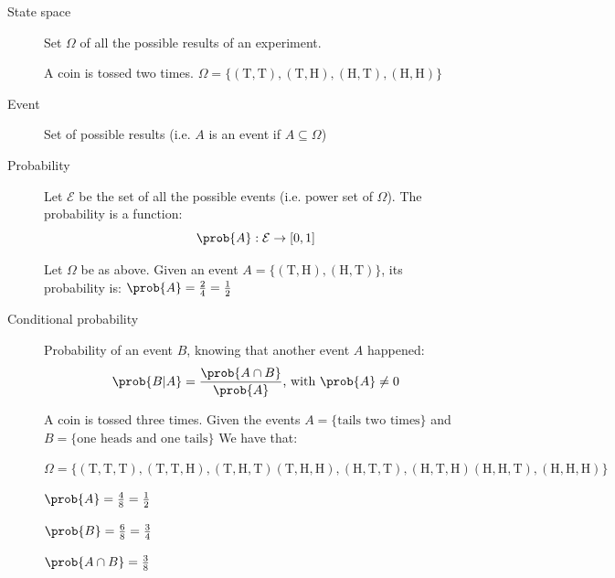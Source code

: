 \begin{description}
    \item[State space] 
        Set $\Omega$ of all the possible results of an experiment.
        \begin{example}
            A coin is tossed two times. 
            $\Omega = \{ (\text{T}, \text{T}), (\text{T}, \text{H}), (\text{H}, \text{T}), (\text{H}, \text{H}) \}$
        \end{example}

    \item[Event] 
        Set of possible results (i.e. $A$ is an event if $A \subseteq \Omega$)

    \item[Probability] 
        Let $\mathcal{E}$ be the set of all the possible events (i.e. power set of $\Omega$).
        The probability is a function:
        \[ \prob{A}: \mathcal{E} \rightarrow [0, 1] \]
        \begin{example}
            Let $\Omega$ be as above.
            Given an event $A = \{ (\text{T}, \text{H}), (\text{H}, \text{T}) \}$, 
            its probability is: $\prob{A} = \frac{2}{4} = \frac{1}{2}$
        \end{example}

    \item[Conditional probability] 
        Probability of an event $B$, knowing that another event $A$ happened:
        \[ \prob{B \vert A} = \frac{\prob{A \cap B}}{\prob{A}} \text{, with } \prob{A} \neq 0 \]

        \begin{example}
            A coin is tossed three times. 
            Given the events $A = \{ \text{tails two times} \}$ and $B = \{ \text{one heads and one tails} \}$
            We have that:

            \begin{minipage}{\linewidth}
                \centering
                \small
                $\Omega = \{ 
                    (\text{T}, \text{T}, \text{T}), (\text{T}, \text{T}, \text{H}), (\text{T}, \text{H}, \text{T})
                    (\text{T}, \text{H}, \text{H}), (\text{H}, \text{T}, \text{T}), (\text{H}, \text{T}, \text{H})
                    (\text{H}, \text{H}, \text{T}), (\text{H}, \text{H}, \text{H})
                \}$
            \end{minipage}

            \begin{minipage}{.325\linewidth}
                \centering
                $\prob{A} = \frac{4}{8} = \frac{1}{2}$
            \end{minipage}
            \begin{minipage}{.325\linewidth}
                \centering
                $\prob{B} = \frac{6}{8} = \frac{3}{4}$
            \end{minipage}
            \begin{minipage}{.325\linewidth}
                \centering
                $\prob{A \cap B} = \frac{3}{8}$
            \end{minipage}


\end{example}
\end{description}
